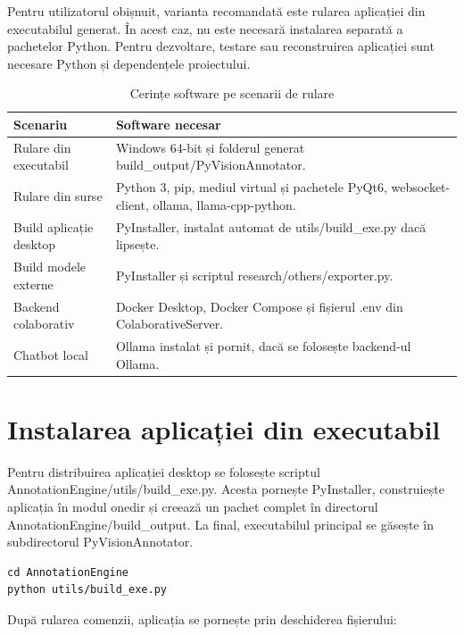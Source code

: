 Pentru utilizatorul obișnuit, varianta recomandată este rularea aplicației din executabilul generat. În acest caz, nu este necesară instalarea separată a pachetelor Python. Pentru dezvoltare, testare sau reconstruirea aplicației sunt necesare Python și dependențele proiectului.

\begin{table}[!htbp]
    \centering
    \small
    \begin{tabular}{p{} p{}}
        \hline
        Scenariu & Software necesar \\
        \hline
        Rulare din executabil & Windows 64-bit și folderul generat build\_output/PyVisionAnnotator. \\
        Rulare din surse & Python 3, pip, mediul virtual și pachetele PyQt6, websocket-client, ollama, llama-cpp-python. \\
        Build aplicație desktop & PyInstaller, instalat automat de utils/build\_exe.py dacă lipsește. \\
        Build modele externe & PyInstaller și scriptul research/others/exporter.py. \\
        Backend colaborativ & Docker Desktop, Docker Compose și fișierul .env din ColaborativeServer. \\
        Chatbot local & Ollama instalat și pornit, dacă se folosește backend-ul Ollama. \\
        \hline
    \end{tabular}
    \caption{Cerințe software pe scenarii de rulare}
    \label{tab:cerinte-software}
\end{table}

\section{Instalarea aplicației din executabil}

Pentru distribuirea aplicației desktop se folosește scriptul AnnotationEngine/\allowbreak utils/\allowbreak build\_exe.py. Acesta pornește PyInstaller, construiește aplicația în modul onedir și creează un pachet complet în directorul AnnotationEngine/\allowbreak build\_output. La final, executabilul principal se găsește în subdirectorul PyVisionAnnotator.

\begin{verbatim}
cd AnnotationEngine
python utils/build_exe.py
\end{verbatim}

După rularea comenzii, aplicația se pornește prin deschiderea fișierului:


